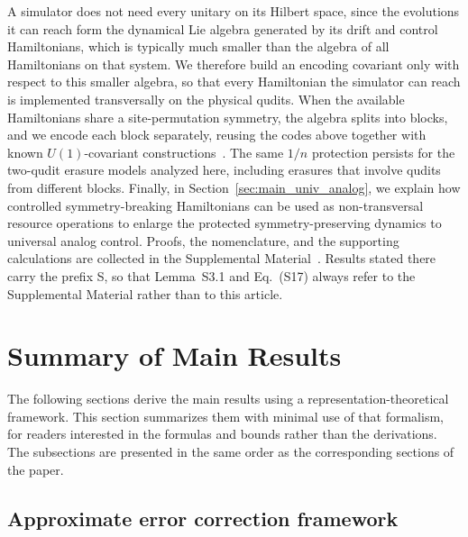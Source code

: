 \documentclass[10pt,twocolumn,superscriptaddress,aps,amsmath,amssymb,citeautoscript,floatfix,prx]{revtex4-2}
\newcounter{alg}
\theoremstyle{plain}
\theoremstyle{plain}
\theoremstyle{plain}
\theoremstyle{plain}
\theoremstyle{plain}
\theoremstyle{plain}
\theoremstyle{plain}
\theoremstyle{definition}
\theoremstyle{plain}
\begin{document}
A simulator does not need every unitary on its Hilbert space, since the evolutions it can reach form the dynamical Lie algebra generated by its drift and control Hamiltonians, which is typically much smaller than the algebra of all Hamiltonians on that system. We therefore build an encoding covariant only with respect to this smaller algebra, so that every Hamiltonian the simulator can reach is implemented transversally 
on the physical qudits. When the available Hamiltonians share a site-permutation symmetry, the algebra splits into blocks, and we encode each block separately, reusing the codes above together with known $U(1)$-covariant constructions~\cite{Lin2025}. The same $1/n$ protection persists for the two-qudit erasure models analyzed here, including erasures that involve qudits from different blocks.
Finally, in Section~\ref{sec:main_univ_analog}, we explain how controlled symmetry-breaking Hamiltonians can be used as non-transversal resource operations to enlarge the protected symmetry-preserving dynamics to universal analog control.
Proofs, the nomenclature, and the supporting calculations are collected in the Supplemental Material~\cite{SuppMat}. Results stated there carry the prefix S, so that Lemma~S3.1 and Eq.~(S17) always refer to the Supplemental Material rather than to this article.

\section{Summary of Main Results}\label{sec:main_summary}
 
The following sections derive the main results using a representation-theoretical framework. 
This section summarizes them with minimal use of that formalism, for readers interested in the formulas and bounds rather than the derivations. The subsections are presented in the same order as the corresponding sections of the paper.
 
\subsection{Approximate error correction framework}\label{subsec:summary_framework}
 
\end{document}
